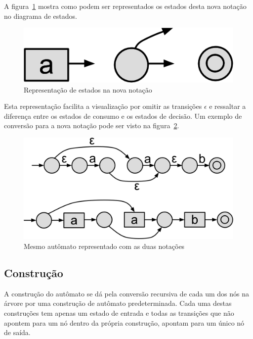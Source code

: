 \documentclass[a4paper,12pt,oneside,onecolumn]{uerj}
\begin{document}
A figura~\ref{fig:nova_notacao} mostra como podem ser representados os estados desta nova notação no diagrama de estados.

\begin{figure}[!htbp]
  \centering
  \includegraphics[scale=0.5]{figures/nova_notacao.png}
  \caption{Representação de estados na nova notação}
  \label{fig:nova_notacao}
\end{figure}

Esta representação facilita a visualização por omitir as transições $\epsilon$ e ressaltar a diferença entre os estados de consumo e os estados de decisão. Um exemplo de conversão para a nova notação pode ser visto na figura~\ref{fig:exemplo_nova_notacao}.

\begin{figure}[!htbp]
  \centering
  \includegraphics[scale=0.25]{figures/exemplo_nova_notacao.png}
  \caption{Mesmo autômato representado com as duas notações}
  \label{fig:exemplo_nova_notacao}
\end{figure}

\subsection{Construção}

A construção do autômato se dá pela conversão recursiva de cada um dos nós na árvore por uma construção de autômato predeterminada. Cada uma destas construções tem apenas um estado de entrada e todas as transições que não apontem para um nó dentro da própria construção, apontam para um único nó de saída.
\end{document}
